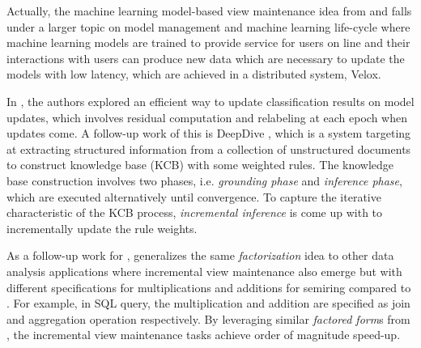 Actually, the machine learning model-based view maintenance idea from \cite{deshpande2006mauvedb} and \cite{gupta2015processing} falls under a larger topic on model management and machine learning life-cycle \cite{crankshawmissing} where machine learning models are trained to provide service for users on line and their interactions with users can produce new data which are necessary to update the models with low latency, which are achieved in a distributed system, Velox.

In \cite{koc2011incrementally}, the authors explored an efficient way to update classification results on model updates, which involves residual computation and relabeling at each epoch when updates come. A follow-up work of this is DeepDive \cite{shin2015incremental}, which is a system targeting at extracting structured information from a collection of unstructured documents to construct knowledge base (KCB) with some weighted rules. The knowledge base construction involves two phases, i.e. {\em grounding phase} and {\em inference phase}, which are executed alternatively until convergence. To capture the iterative characteristic of the KCB process, {\em incremental inference} is come up with to incrementally update the rule weights.

As a follow-up work for \cite{nikolic2014linview}, \cite{nikolic2018incremental} generalizes the same {\em factorization} idea to other data analysis applications where incremental view maintenance also emerge but with different specifications for multiplications and additions for semiring compared to \cite{nikolic2014linview}. For example, in SQL query, the multiplication and addition are specified as join and aggregation operation respectively. By leveraging similar {\em factored form}s from \cite{nikolic2014linview}, the incremental view maintenance tasks achieve order of magnitude speed-up.

